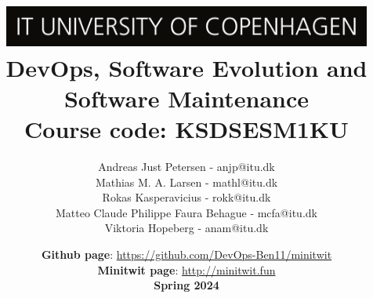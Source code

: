 \documentclass[a4paper,12pt]{article}
\title{%
\includegraphics[width=345.0pt]{ITU_logo_UK jpg.jpg}
\vspace{0.5cm}\\
{\Huge \textbf{DevOps, Software Evolution and Software Maintenance}}\\
\vspace{0.5cm}
Course code: KSDSESM1KU
}
\author{Andreas Just Petersen - anjp@itu.dk \\ Mathias M. A. Larsen - mathl@itu.dk \\ Rokas Kasperavicius - rokk@itu.dk \\ Matteo Claude Philippe Faura Behague - mcfa@itu.dk \\ Viktoria Hopeberg - anam@itu.dk}
\date{
\textbf{Github page}: \href{https://github.com/DevOps-Ben11/minitwit}{https://github.com/DevOps-Ben11/minitwit}\\
\textbf{Minitwit page}: \href{http://minitwit.fun}{http://minitwit.fun}
\\
\vspace{1cm}
\textbf{Spring 2024}
}
\begin{document}
\begin{titlingpage}
    \maketitle
\end{titlingpage}

\newpage
\tableofcontents
\newpage







\printbibliography
\end{document}
